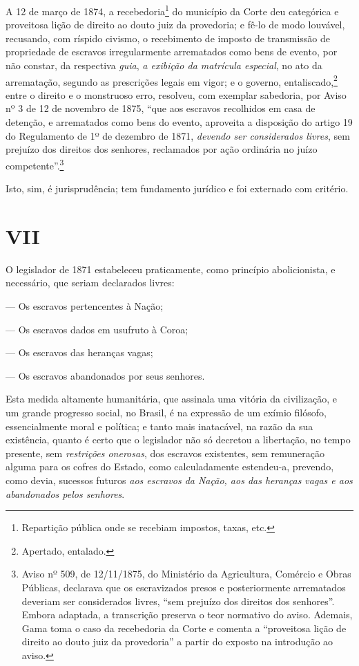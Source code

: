 A 12 de março de 1874, a recebedoria\footnote{Repartição pública onde
  se recebiam impostos, taxas, etc.} do município da Corte deu
categórica e proveitosa lição de direito ao douto juiz da provedoria; e
fê-lo de modo louvável, recusando, com ríspido civismo, o recebimento de
imposto de transmissão de propriedade de escravos irregularmente
arrematados como bens de evento, por não constar, da respectiva
\emph{guia}, \emph{a exibição da matrícula especial}, no ato da
arrematação, segundo as prescrições legais em vigor; e o governo,
entaliscado,\footnote{Apertado, entalado.} entre o direito e o
monstruoso erro, resolveu, com exemplar sabedoria, por Aviso nº 3 de 12
de novembro de 1875, ``que aos escravos recolhidos em casa de detenção, e
arrematados como bens do evento, aproveita a disposição do artigo 19 do
Regulamento de 1º de dezembro de 1871, \emph{devendo ser considerados
livres}, sem prejuízo dos direitos dos senhores, reclamados por ação
ordinária no juízo competente''.\footnote{Aviso nº 509, de 12/11/1875,
  do Ministério da Agricultura, Comércio e Obras Públicas, declarava que
  os escravizados presos e posteriormente arrematados deveriam ser
  considerados livres, ``sem prejuízo dos direitos dos senhores''. Embora
  adaptada, a transcrição preserva o teor normativo do aviso. Ademais,
  Gama toma o caso da recebedoria da Corte e comenta a ``proveitosa lição
  de direito ao douto juiz da provedoria'' a partir do exposto na
  introdução ao aviso.}

Isto, sim, é jurisprudência; tem fundamento jurídico e foi externado com
critério.

\section*{VII}

O legislador de 1871 estabeleceu praticamente, como princípio
abolicionista, e necessário, que seriam declarados livres:

--- Os escravos pertencentes à Nação;

--- Os escravos dados em usufruto à Coroa;

--- Os escravos das heranças vagas;

--- Os escravos abandonados por seus senhores.

Esta medida altamente humanitária, que assinala uma vitória da
civilização, e um grande progresso social, no Brasil, é na expressão de
um exímio filósofo, essencialmente moral e política; e tanto mais
inatacável, na razão da sua existência, quanto é certo que o legislador
não só decretou a libertação, no tempo presente, sem \emph{restrições
onerosas}, dos escravos existentes, sem remuneração alguma para os
cofres do Estado, como calculadamente estendeu-a, prevendo, como devia,
sucessos futuros \emph{aos escravos da Nação, aos das heranças vagas e
aos abandonados pelos senhores}.

